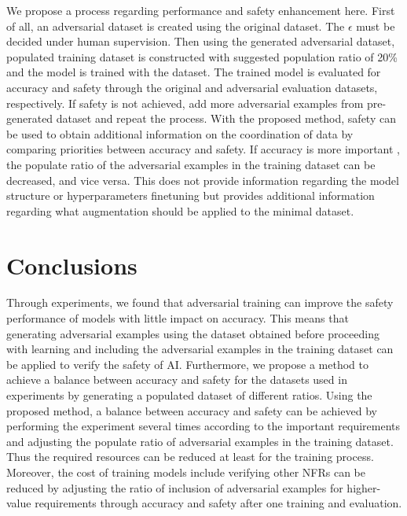 \documentclass[symmetry,article,submit,moreauthors,pdftex]{Definitions/mdpi}
\begin{document}
We propose a process regarding performance and safety enhancement here.
First of all, an adversarial dataset is created using the original dataset. The \begin{math}\epsilon\end{math} must be decided under human supervision.
Then using the generated adversarial dataset, populated training dataset is constructed with suggested population ratio of 20\% and the model is trained with the dataset.
The trained model is evaluated for accuracy and safety through the original and adversarial evaluation datasets, respectively. If safety is not achieved, add more adversarial examples from pre-generated dataset and repeat the process.
With the proposed method, safety can be used to obtain additional information on the coordination of data by comparing priorities between accuracy and safety.
If accuracy is more important , the populate ratio of the adversarial examples in the training dataset can be decreased, and vice versa.
This does not provide information regarding the model structure or hyperparameters finetuning but provides additional information regarding what augmentation should be applied to the minimal dataset.

\section{Conclusions}

Through experiments, we found that adversarial training can improve the safety performance of models with little impact on accuracy.
This means that generating adversarial examples using the dataset obtained before proceeding with learning and including the adversarial examples in the training dataset can be applied to verify the safety of AI.
Furthermore, we propose a method to achieve a balance between accuracy and safety for the datasets used in experiments by generating a populated dataset of different ratios.
Using the proposed method, a balance between accuracy and safety can be achieved by performing the experiment several times according to the important requirements and adjusting the populate ratio of adversarial examples in the training dataset.
Thus the required resources can be reduced at least for the training process.
Moreover, the cost of training models include verifying other NFRs can be reduced by adjusting the ratio of inclusion of adversarial examples for higher-value requirements through accuracy and safety after one training and evaluation.
\end{document}
